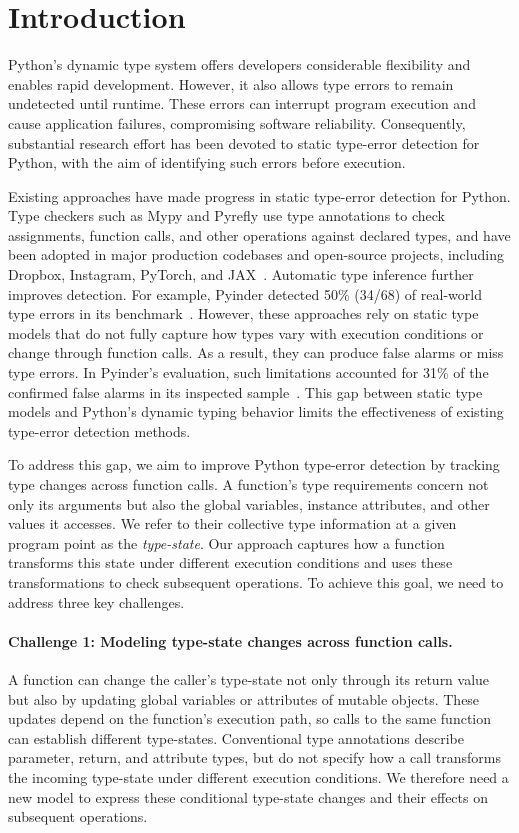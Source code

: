 \section{Introduction}
\label{sec:introduction}
Python's dynamic type system offers developers considerable flexibility
and enables rapid development. However, it also allows type errors to
remain undetected until runtime. These errors can interrupt program
execution and cause application failures, compromising software
reliability. Consequently, substantial research effort has been devoted
to static type-error detection for Python, with the aim of identifying
such errors before execution.

Existing approaches have made progress in static type-error detection
for Python. Type checkers such as Mypy and Pyrefly use type annotations
to check assignments, function calls, and other operations against declared
types, and have been adopted in major production codebases and open-source
projects, including Dropbox, Instagram, PyTorch, and
JAX~\cite{dropboxMypy,pyreflyAdoption}. Automatic type inference further
improves detection. For example, Pyinder detected 50\% (34/68) of real-world type
errors  in its benchmark~\cite{oh2024pyinder}.
However, these approaches rely on static type models that do not fully
capture how types vary with execution conditions or change through function
calls. As a result, they can produce false alarms or miss type errors.
In Pyinder's evaluation, such limitations accounted for 31\% of the
confirmed false alarms in its inspected sample~\cite{oh2024pyinder}.
This gap between static type models and Python's dynamic typing behavior
limits the effectiveness of existing type-error detection methods.

To address this gap, we aim to improve Python type-error detection by
tracking type changes across function calls. A function's type requirements
concern not only its arguments but also the global variables, instance
attributes, and other values it accesses. We refer to their collective type
information at a given program point as the \emph{type-state}. Our approach
captures how a function transforms this state under different execution
conditions and uses these transformations to check subsequent operations.
To achieve this goal, we need to address three key challenges.

\paragraph{Challenge 1: Modeling type-state changes across function calls.}
A function can change the caller's type-state not only through its return
value but also by updating global variables or attributes of mutable
objects. These updates depend on the function's execution path, so calls
to the same function can establish different type-states. Conventional
type annotations describe parameter, return, and attribute types, but do
not specify how a call transforms the incoming type-state under different
execution conditions. We therefore need a new model to express these
conditional type-state changes and their effects on subsequent operations.

